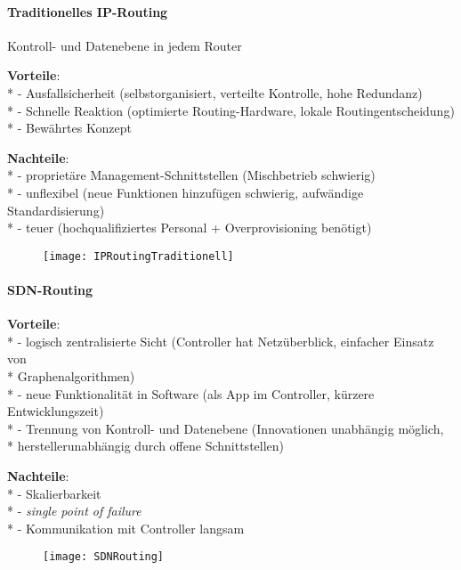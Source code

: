 \paragraph{Traditionelles IP-Routing}
\begin{items}
  \item Kontroll- und Datenebene in jedem Router
  \item \textbf{Vorteile}: \\*
    - Ausfallsicherheit (selbstorganisiert, verteilte Kontrolle, hohe Redundanz) \\*
    - Schnelle Reaktion (optimierte Routing-Hardware, lokale Routingentscheidung) \\*
    - Bewährtes Konzept
  \item \textbf{Nachteile}: \\*
    - proprietäre Management-Schnittstellen (Mischbetrieb schwierig) \\*
    - unflexibel (neue Funktionen hinzufügen schwierig, aufwändige Standardisierung) \\*
    - teuer (hochqualifiziertes Personal + Overprovisioning benötigt)
\end{items}
\begin{figure}[H]\centering\label{IPRoutingTraditionell}\texttt{[image: IPRoutingTraditionell]}\end{figure}

\paragraph{SDN-Routing}
\begin{items}
  \item \textbf{Vorteile}: \\*
    - logisch zentralisierte Sicht (Controller hat Netzüberblick, einfacher Einsatz von \\* \phantom{-} \phantom{\( \cdot \)} Graphenalgorithmen) \\*
    - neue Funktionalität in Software (als App im Controller, kürzere Entwicklungszeit) \\*
    - Trennung von Kontroll- und Datenebene (Innovationen unabhängig möglich, \\* \phantom{-} \phantom{\( \cdot \)} herstellerunabhängig durch offene Schnittstellen)
  \item \textbf{Nachteile}: \\*
    - Skalierbarkeit \\*
    - \emph{single point of failure} \\*
    - Kommunikation mit Controller langsam
\end{items}
\begin{figure}[H]\centering\label{SDNRouting}\texttt{[image: SDNRouting]}\end{figure}


